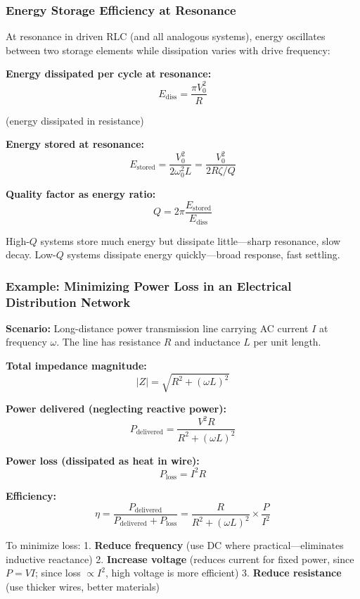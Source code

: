 \documentclass[
]{article}
\begin{document}
\subsubsection{Energy Storage Efficiency at
Resonance}\label{energy-storage-efficiency-at-resonance}

At resonance in driven RLC (and all analogous systems), energy
oscillates between two storage elements while dissipation varies with
drive frequency:

\textbf{Energy dissipated per cycle at resonance:}
\[E_{\text{diss}} = \frac{\pi V_0^2}{R}\]

(energy dissipated in resistance)

\textbf{Energy stored at resonance:}
\[E_{\text{stored}} = \frac{V_0^2}{2\omega_0^2 L} = \frac{V_0^2}{2R\zeta/Q}\]

\textbf{Quality factor as energy ratio:}
\[Q = 2\pi \frac{E_{\text{stored}}}{E_{\text{diss}}}\]

High-\(Q\) systems store much energy but dissipate little---sharp
resonance, slow decay. Low-\(Q\) systems dissipate energy
quickly---broad response, fast settling.

\subsubsection{Example: Minimizing Power Loss in an Electrical
Distribution
Network}\label{example-minimizing-power-loss-in-an-electrical-distribution-network}

\textbf{Scenario:} Long-distance power transmission line carrying AC
current \(I\) at frequency \(\omega\). The line has resistance \(R\) and
inductance \(L\) per unit length.

\textbf{Total impedance magnitude:} \[|Z| = \sqrt{R^2 + (\omega L)^2}\]

\textbf{Power delivered (neglecting reactive power):}
\[P_{\text{delivered}} = \frac{V^2 R}{R^2 + (\omega L)^2}\]

\textbf{Power loss (dissipated as heat in wire):}
\[P_{\text{loss}} = I^2 R\]

\textbf{Efficiency:}
\[\eta = \frac{P_{\text{delivered}}}{P_{\text{delivered}} + P_{\text{loss}}} = \frac{R}{R^2 + (\omega L)^2} \times \frac{P}{I^2}\]

To minimize loss: 1. \textbf{Reduce frequency} (use DC where
practical---eliminates inductive reactance) 2. \textbf{Increase voltage}
(reduces current for fixed power, since \(P = VI\); since loss
\(\propto I^2\), high voltage is more efficient) 3. \textbf{Reduce
resistance} (use thicker wires, better materials)
\end{document}
